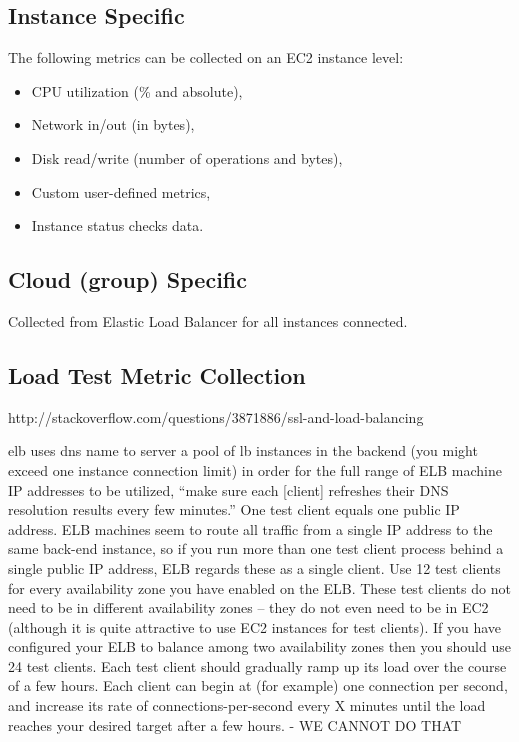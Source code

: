 \documentclass{uvamscse}
\begin{document}
\subsection{Instance Specific}
The following metrics can be collected on an EC2 instance level:
\begin{itemize}
  \item CPU utilization (\% and absolute),
  \item Network in/out (in bytes),
  \item Disk read/write (number of operations and bytes),
  \item Custom user-defined metrics,
  \item Instance status checks data.
\end{itemize}

\subsection{Cloud (group) Specific}
Collected from Elastic Load Balancer for all instances connected.

\subsection{Load Test Metric Collection}
http://stackoverflow.com/questions/3871886/ssl-and-load-balancing

elb uses dns name to server a pool of lb instances in the backend (you might exceed one instance connection limit)
in order for the full range of ELB machine IP addresses to be utilized, “make sure each [client] refreshes their DNS resolution results every few minutes.”
One test client equals one public IP address. ELB machines seem to route all traffic from a single IP address to the same back-end instance, so if you run more than one test client process behind a single public IP address, ELB regards these as a single client.
Use 12 test clients for every availability zone you have enabled on the ELB. These test clients do not need to be in different availability zones – they do not even need to be in EC2 (although it is quite attractive to use EC2 instances for test clients). If you have configured your ELB to balance among two availability zones then you should use 24 test clients.
Each test client should gradually ramp up its load over the course of a few hours. Each client can begin at (for example) one connection per second, and increase its rate of connections-per-second every X minutes until the load reaches your desired target after a few hours. - WE CANNOT DO THAT
\end{document}
